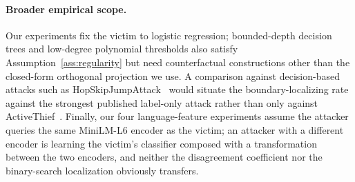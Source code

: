 \documentclass[runningheads,envcountsame]{llncs}
\begin{document}
\paragraph{Broader empirical scope.} Our experiments fix the victim to logistic regression; bounded-depth decision trees and low-degree polynomial thresholds also satisfy Assumption~\ref{ass:regularity} but need counterfactual constructions other than the closed-form orthogonal projection we use. A comparison against decision-based attacks such as HopSkipJumpAttack~\cite{chen2020hopskipjump} would situate the boundary-localizing rate against the strongest published label-only attack rather than only against ActiveThief~\cite{pal2020activethief}. Finally, our four language-feature experiments assume the attacker queries the same MiniLM-L6 encoder as the victim; an attacker with a different encoder is learning the victim's classifier composed with a transformation between the two encoders, and neither the disagreement coefficient nor the binary-search localization obviously transfers.



\end{document}
